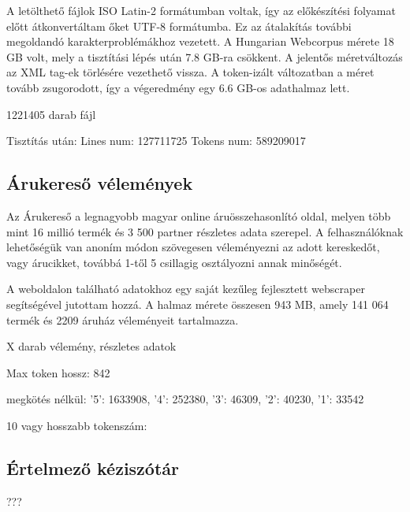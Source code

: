 A letölthető fájlok ISO Latin-2 formátumban voltak, így az előkészítési folyamat előtt átkonvertáltam őket UTF-8 formátumba. Ez az átalakítás további megoldandó karakterproblémákhoz vezetett. A Hungarian Webcorpus mérete 18 GB volt, mely a tisztítási lépés után 7.8 GB-ra csökkent. A jelentős méretváltozás az XML tag-ek törlésére vezethető vissza. A token-izált változatban a méret tovább zsugorodott, így a végeredmény egy 6.6 GB-os adathalmaz lett.

1221405 darab fájl

Tisztítás után:
Lines num: 127711725
Tokens num: 589209017


\subsection{Árukereső vélemények}
Az Árukereső a legnagyobb magyar online áruösszehasonlító oldal, melyen több mint 16 millió termék és 3 500 partner részletes adata szerepel. A felhasználóknak lehetőségük van anoním módon szövegesen véleményezni az adott kereskedőt, vagy árucikket, továbbá 1-től 5 csillagig osztályozni annak minőségét.

A weboldalon található adatokhoz egy saját kezűleg fejlesztett webscraper segítségével jutottam hozzá. A halmaz mérete összesen 943 MB, amely 141 064 termék és 2209 áruház véleményeit tartalmazza.

X darab vélemény, 
részletes adatok

Max token hossz: 842

megkötés nélkül: {'5': 1633908, '4': 252380, '3': 46309, '2': 40230, '1': 33542}

10 vagy hosszabb tokenszám:



\subsection{Értelmező kéziszótár}

???





